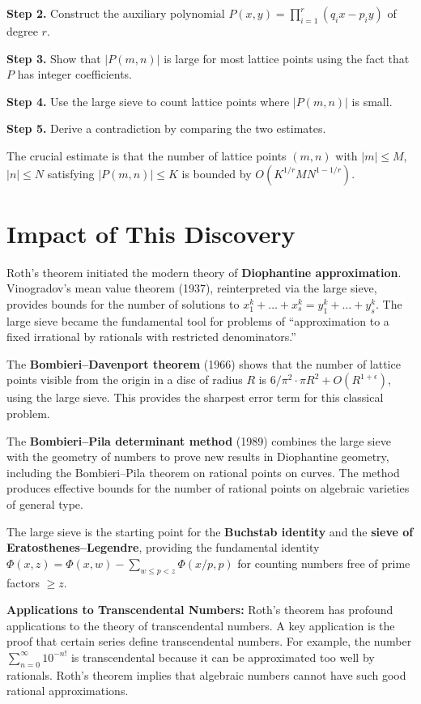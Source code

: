 \textbf{Step 2.} Construct the auxiliary polynomial $P(x,y) = \prod_{i=1}^r
(q_i x - p_i y)$ of degree $r$.

\textbf{Step 3.} Show that $|P(m,n)|$ is large for most lattice points using
the fact that $P$ has integer coefficients.

\textbf{Step 4.} Use the large sieve to count lattice points where $|P(m,n)|$
is small.

\textbf{Step 5.} Derive a contradiction by comparing the two estimates.

The crucial estimate is that the number of lattice points $(m,n)$ with $|m|
\leq M$, $|n| \leq N$ satisfying $|P(m,n)| \leq K$ is bounded by $O(K^{1/r}
MN^{1-1/r})$.

\section{Impact of This Discovery}

Roth's theorem initiated the modern theory of \textbf{Diophantine approximation}.
Vinogradov's mean value theorem (1937), reinterpreted via the large sieve,
provides bounds for the number of solutions to $x_1^k + \ldots + x_s^k = y_1^k
+ \ldots + y_s^k$. The large sieve became the fundamental tool for problems of
``approximation to a fixed irrational by rationals with restricted denominators.''

The \textbf{Bombieri--Davenport theorem} (1966) shows that the number of
lattice points visible from the origin in a disc of radius $R$ is
$6/\pi^2 \cdot \pi R^2 + O(R^{1+\epsilon})$, using the large sieve. This
provides the sharpest error term for this classical problem.

The \textbf{Bombieri--Pila determinant method} (1989) combines the large sieve
with the geometry of numbers to prove new results in Diophantine geometry,
including the Bombieri--Pila theorem on rational points on curves. The method
produces effective bounds for the number of rational points on algebraic
varieties of general type.

The large sieve is the starting point for the \textbf{Buchstab identity} and
the \textbf{sieve of Eratosthenes--Legendre}, providing the fundamental
identity $\Phi(x, z) = \Phi(x, w) - \sum_{w \leq p < z} \Phi(x/p, p)$ for
counting numbers free of prime factors $\geq z$.

\textbf{Applications to Transcendental Numbers:} Roth's theorem has profound
applications to the theory of transcendental numbers. A key application is the
proof that certain series define transcendental numbers. For example, the
number $\sum_{n=0}^{\infty} 10^{-n!}$ is transcendental because it can be
approximated too well by rationals. Roth's theorem implies that algebraic
numbers cannot have such good rational approximations.

